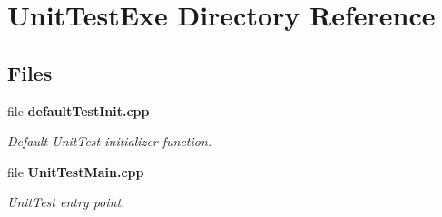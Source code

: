 \section{Unit\+Test\+Exe Directory Reference}
\label{dir_842e32f441ec3669c8d08877cfe6cd6d}
\subsection*{Files}
\begin{DoxyCompactItemize}
\item 
file {\bf default\+Test\+Init.\+cpp}
\begin{DoxyCompactList}\small\item\em Default Unit\+Test initializer function. \end{DoxyCompactList}\item 
file {\bf Unit\+Test\+Main.\+cpp}
\begin{DoxyCompactList}\small\item\em Unit\+Test entry point. \end{DoxyCompactList}\end{DoxyCompactItemize}
